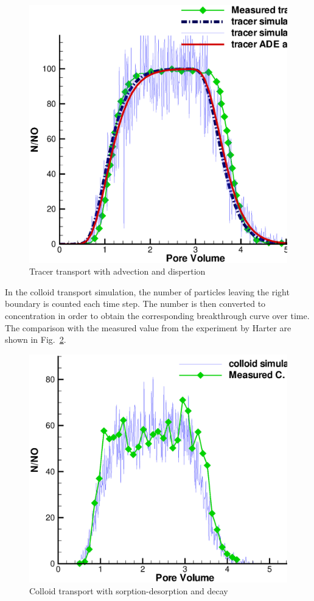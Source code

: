 \begin{figure}[htbp!]
\centering
\includegraphics[scale=0.35]{PART_II/C/Tracertransport.eps}
\caption{Tracer transport with advection and dispertion}
\label{Tracertransport}
\end{figure}

In the colloid transport simulation, the number of particles leaving the right boundary is counted each time step. The number is then converted to concentration in order to obtain the corresponding breakthrough curve over time. The comparison with the measured value from the experiment by Harter are shown in Fig.~\ref{ColloidTransport}.

\begin{figure}[htbp!]
\centering
\includegraphics[scale=0.4]{PART_II/C/ColloidTransport.eps}
\caption{Colloid transport with sorption-desorption and decay}
\label{ColloidTransport}
\end{figure}
